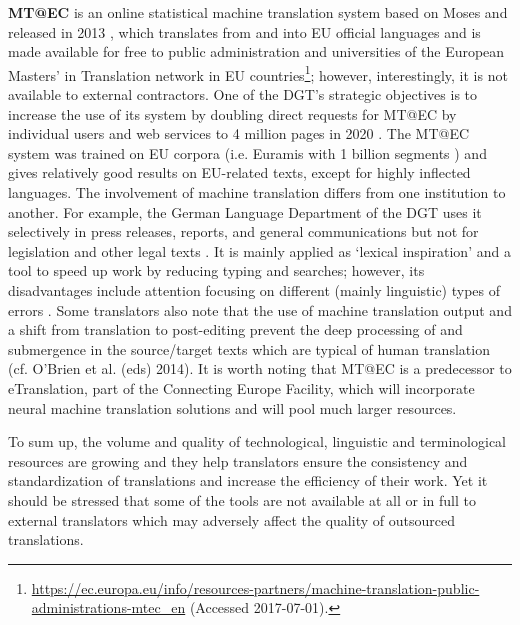 \documentclass[output=paper]{langsci/langscibook}
\begin{document}
\textbf{MT@EC} is an online statistical machine translation system based on Moses and released in 2013 \citep{Mai2016}, which translates from and into EU official languages and is made available for free to public administration and universities of the European Masters’ in Translation network in EU countries\footnote{\url{https://ec.europa.eu/info/resources-partners/machine-translation-public-administrations-mtec_en} (Accessed 2017-07-01).}; however, interestingly, it is not available to external contractors. One of the DGT’s strategic objectives is to increase the use of its system by doubling direct requests for MT@EC by individual users and web services to 4 million pages in 2020 \citep[9]{DGT2016b}. The MT@EC system was trained on EU corpora (i.e. Euramis with 1 billion segments \citep{Mai2016}) and gives relatively good results on EU-related texts, except for highly inflected languages. The involvement of machine translation differs from one institution to another. For example, the German Language Department of the DGT uses it selectively in press releases, reports, and general communications but not for legislation and other legal texts \citep{Mai2016}. It is mainly applied as ‘lexical inspiration’ and a tool to speed up work by reducing typing and searches; however, its disadvantages include attention focusing on different (mainly linguistic) types of errors \citep{Mai2016}. Some translators also note that the use of machine translation output and a shift from translation to post-editing prevent the deep processing of and submergence in the source/target texts which are typical of human translation (cf. O'Brien et al. (eds) 2014). It is worth noting that MT@EC is a predecessor to eTranslation, part of the Connecting Europe Facility, which will incorporate neural machine translation solutions and will pool much larger resources.
% 
% 

To sum up, the volume and quality of technological, linguistic and terminological resources are growing and they help translators ensure the consistency and standardization of translations and increase the efficiency of their work. Yet it should be stressed that some of the tools are not available at all or in full to external translators which may adversely affect the quality of outsourced translations.
\end{document}
